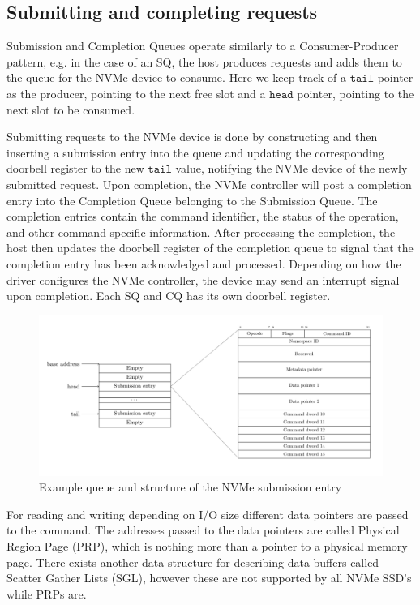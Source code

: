 \subsection{Submitting and completing requests}
Submission and Completion Queues operate similarly to a Consumer-Producer pattern, e.g. in the case of an SQ, the host produces requests and adds them to the queue for the NVMe device to consume. Here we keep track of a $\texttt{tail}$ pointer as the producer, pointing to the next free slot and a $\texttt{head}$ pointer, pointing to the next slot to be consumed.

Submitting requests to the NVMe device is done by constructing and then inserting a submission entry into the queue and updating the corresponding doorbell register to the new $\texttt{tail}$ value, notifying the NVMe device of the newly submitted request. Upon completion, the NVMe controller will post a completion entry into the Completion Queue belonging to the Submission Queue. The completion entries contain the command identifier, the status of the operation, and other command specific information. After processing the completion, the host then updates the doorbell register of the completion queue to signal that the completion entry has been acknowledged and processed. Depending on how the driver configures the NVMe controller, the device may send an interrupt signal upon completion. Each SQ and CQ has its own doorbell register.

\begin{figure}
  \centering
    \includegraphics[width=\textwidth]{figures/nvme-queue}
    \caption{Example queue and structure of the NVMe submission entry}
    \label{fig:nvme-queue}
\end{figure}


For reading and writing depending on I/O size different data pointers are passed to the command. The addresses passed to the data pointers are called Physical Region Page (PRP), which is nothing more than a pointer to a physical memory page. There exists another data structure for describing data buffers called Scatter Gather Lists (SGL), however these are not supported by all NVMe SSD's while PRPs are.

